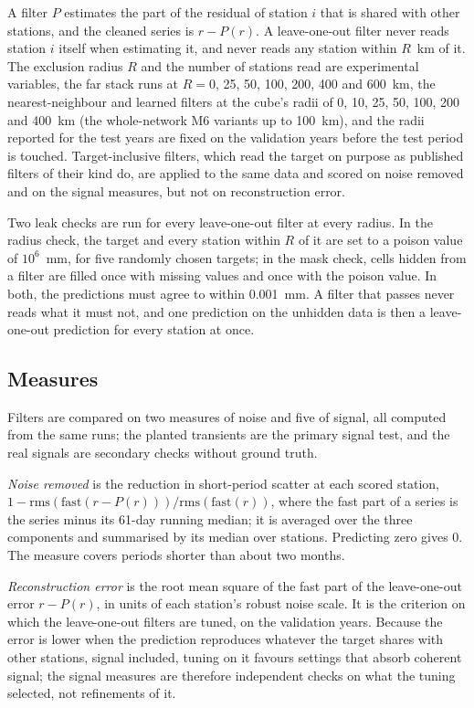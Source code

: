 \documentclass[preprint,12pt,authoryear]{elsarticle}
\begin{document}
A filter $P$ estimates the part of the residual of station $i$ that is shared with other stations, and the cleaned series is $r - P(r)$. A leave-one-out filter never reads station $i$ itself when estimating it, and never reads any station within $R$~km of it. The exclusion radius $R$ and the number of stations read are experimental variables, the far stack runs at $R = 0$, 25, 50, 100, 200, 400 and 600~km, the nearest-neighbour and learned filters at the cube's radii of 0, 10, 25, 50, 100, 200 and 400~km (the whole-network M6 variants up to 100~km), and the radii reported for the test years are fixed on the validation years before the test period is touched. Target-inclusive filters, which read the target on purpose as published filters of their kind do, are applied to the same data and scored on noise removed and on the signal measures, but not on reconstruction error.

Two leak checks are run for every leave-one-out filter at every radius. In the radius check, the target and every station within $R$ of it are set to a poison value of $10^6$~mm, for five randomly chosen targets; in the mask check, cells hidden from a filter are filled once with missing values and once with the poison value. In both, the predictions must agree to within 0.001~mm. A filter that passes never reads what it must not, and one prediction on the unhidden data is then a leave-one-out prediction for every station at once.

\subsection{Measures}
\label{sec:measures}

Filters are compared on two measures of noise and five of signal, all computed from the same runs; the planted transients are the primary signal test, and the real signals are secondary checks without ground truth.

\emph{Noise removed} is the reduction in short-period scatter at each scored station, $1 - \mathrm{rms}(\mathrm{fast}(r - P(r))) / \mathrm{rms}(\mathrm{fast}(r))$, where the fast part of a series is the series minus its 61-day running median; it is averaged over the three components and summarised by its median over stations. Predicting zero gives 0. The measure covers periods shorter than about two months.

\emph{Reconstruction error} is the root mean square of the fast part of the leave-one-out error $r - P(r)$, in units of each station's robust noise scale. It is the criterion on which the leave-one-out filters are tuned, on the validation years. Because the error is lower when the prediction reproduces whatever the target shares with other stations, signal included, tuning on it favours settings that absorb coherent signal; the signal measures are therefore independent checks on what the tuning selected, not refinements of it.
\end{document}
